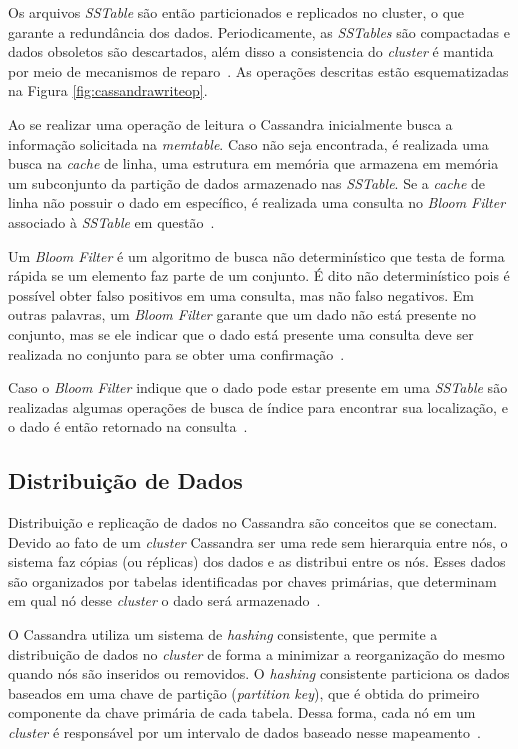 Os arquivos \emph{SSTable} são então particionados e replicados no cluster, o que garante a redundância dos dados. Periodicamente, as \emph{SSTables} são compactadas e dados obsoletos são descartados, além disso a consistencia do \emph{cluster} é mantida por meio de mecanismos de reparo~\cite{cassandraguide, cassandradocs}. As operações descritas estão esquematizadas na Figura \ref{fig:cassandrawriteop}.


Ao se realizar uma operação de leitura o Cassandra inicialmente busca a informação solicitada na \emph{memtable}. Caso não seja encontrada, é realizada uma busca na \emph{cache} de linha, uma estrutura em memória que armazena em memória um subconjunto da partição de dados armazenado nas \emph{SSTable}. Se a \emph{cache} de linha não possuir o dado em específico, é realizada uma consulta no \emph{Bloom Filter} associado à \emph{SSTable} em questão~\cite{cassandradocs}. 

Um \emph{Bloom Filter} é um algoritmo de busca não determinístico que testa de forma rápida se um elemento faz parte de um conjunto. É dito não determinístico pois é possível obter falso positivos em uma consulta, mas não falso negativos. Em outras palavras, um \emph{Bloom Filter} garante que um dado não está presente no conjunto, mas se ele indicar que o dado está presente uma consulta deve ser realizada no conjunto para se obter uma confirmação~\cite{cassandraguide}.

Caso o \emph{Bloom Filter} indique que o dado pode estar presente em uma \emph{SSTable} são realizadas algumas operações de busca de índice para encontrar sua localização, e o dado é então retornado na consulta~\cite{cassandradocs}.

\subsection{Distribuição de Dados}
Distribuição e replicação de dados no Cassandra são conceitos que se conectam. Devido ao fato de um \emph{cluster} Cassandra ser uma rede sem hierarquia entre nós, o sistema faz cópias (ou réplicas) dos dados e as distribui entre os nós. Esses dados são organizados por tabelas identificadas por chaves primárias, que determinam em qual nó desse \emph{cluster} o dado será armazenado~\cite{cassandradocs}.

O Cassandra utiliza um sistema de \emph{hashing} consistente, que permite a distribuição de dados no \emph{cluster} de forma a minimizar a reorganização do mesmo quando nós são inseridos ou removidos. O \emph{hashing} consistente particiona os dados baseados em uma chave de partição (\emph{partition key}), que é obtida do primeiro componente da chave primária de cada tabela. Dessa forma, cada nó em um \emph{cluster} é responsável por um intervalo de dados baseado nesse mapeamento~\cite{cassandradocs}.

